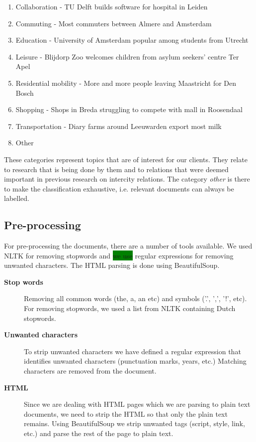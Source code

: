 \begin{enumerate}
    \item Collaboration - TU Delft builds software for hospital in Leiden
    \item Commuting - Most commuters between Almere and Amsterdam
    \item Education - University of Amsterdam popular among students from Utrecht
    \item Leisure - Blijdorp Zoo welcomes children from asylum seekers' centre Ter Apel
    \item Residential mobility - More and more people leaving Maastricht for Den Bosch
    \item Shopping - Shops in Breda struggling to compete with mall in Roosendaal
    \item Transportation - Diary farms around Leeuwarden export most milk
    \item Other
\end{enumerate}

These categories represent topics that are of interest for our clients. They relate to research that is being done by them and to relations that were deemed important in previous research on intercity relations. The category \textit{other} is there to make the classification exhaustive, i.e. relevant documents can always be labelled.

\subsection{Pre-processing}
For pre-processing the documents, there are a number of tools available. We used NLTK \cite{nlkt_stemming} for removing stopwords and \colorbox{green}{we use} regular expressions for removing unwanted characters. The HTML parsing is done using BeautifulSoup\cite{BeautifulSoup}.

\begin{description}
\item[\textbf{Stop words}]
Removing all common words (the, a, an etc) and symbols ('.', ',', '!', etc). For removing stopwords, we used a list from NLTK containing Dutch stopwords.
\item[\textbf{Unwanted characters}]
To strip unwanted characters we have defined a regular expression that identifies unwanted characters (punctuation marks, years, etc.) Matching characters are removed from the document. 
\item[\textbf{HTML}]
Since we are dealing with HTML pages which we are parsing to plain text documents, we need to strip the HTML so that only the plain text remains. Using BeautifulSoup we strip unwanted tags (script, style, link, etc.) and parse the rest of the page to plain text.
\end{description}

